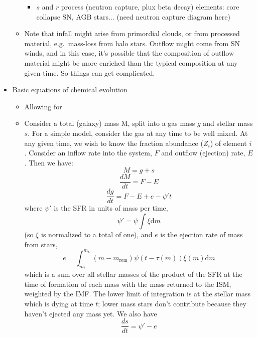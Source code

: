 \documentclass{article}
\begin{document}
\begin{itemize}
\begin{itemize}
\begin{itemize}
                \item $s$ and $r$ process (neutron capture, plux beta
                        decay) elements: core collapse SN, AGB stars$\ldots$
                        (need neutron capture diagram here)
            \end{itemize} %
            \item Note that infall might arise from primordial clouds, or from
                processed material, e.g.\ mass-loss from halo stars. Outflow
                might come from SN winds, and in this case, it's possible that
                the composition of outflow material might be more enriched than
                the typical composition at any given time. So things can get
                complicated.
        \end{itemize} %
    \item Basic equations of chemical evolution
        \begin{itemize}
            \item Allowing for
            \item Consider a total (galaxy) mass M, split into a gas mass
                $g$ and stellar mass $s$. For a simple model, consider the
                gas at any time to be well mixed. At any given time, we wish
                to know the fraction abundance ($Z_i$) of element $i$.
                Consider an inflow rate into the system, $F$ and outflow
                (ejection) rate, $E$. Then we have:
                $$ M = g + s $$
                $$ \frac{dM}{dt} = F - E $$
                $$ \frac{dg}{dt} = F - E + e - \psi't $$
                where $\psi'$ is the SFR in units of mass per time,
                $$ \psi' = \psi\int\xi\textrm{d}m $$
                (so $\xi$ is normalized to a total of one), and $e$ is the
                ejection rate of mass from stars,
                $$ e = \int_{m_t}^{m_U} \left(m-m_{\textrm{rem}}\right)
                \psi\left(t-\tau(m)\right)
                \xi\left(m\right)\textrm{d}m $$
                which is a sum over all stellar masses of the product of the
                SFR at the time of formation of each mass with the mass returned
                to the ISM, weighted by the IMF\@. The lower limit of integration
                is at the stellar mass which is dying at time $t$; lower mass
                stars don't contribute because they haven't ejected any mass yet.
                We also have
                $$ \frac{ds}{dt} = \psi' - e$$

\end{itemize}
\end{itemize}
\end{document}
